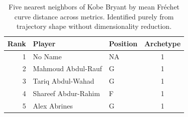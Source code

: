 \begin{table}[htbp]
  \centering\small
  \begin{tabular}{rllc}
    \toprule
    Rank & Player & Position & Archetype \\
    \midrule
    1 & No Name & NA & 1 \\
    2 & Mahmoud Abdul-Rauf & G & 1 \\
    3 & Tariq Abdul-Wahad & G & 1 \\
    4 & Shareef Abdur-Rahim & F & 1 \\
    5 & Alex Abrines & G & 1 \\
    \bottomrule
  \end{tabular}
  \caption{Five nearest neighbors of Kobe Bryant by mean Fr\'{e}chet curve distance across metrics. Identified purely from trajectory shape without dimensionality reduction.}
\end{table}

